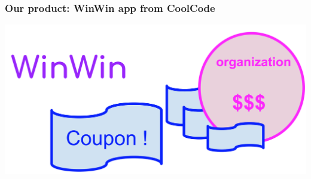 \begin{frame}
\frametitle{Our product: WinWin app from CoolCode}
\vskip 1.15cm
    \includegraphics[width=1.0\textwidth]{./pictures/coupon-001.png}
\end{frame}


